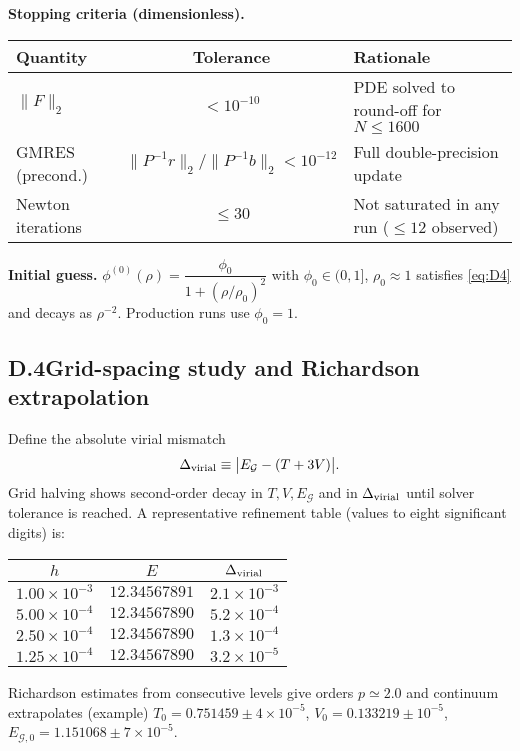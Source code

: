 \documentclass{article}
\begin{document}
\textbf{Stopping criteria (dimensionless).}
\begin{center}
\renewcommand{\arraystretch}{1.1}
\begin{tabular}{lcl}
\hline
Quantity & Tolerance & Rationale \\
\hline
$\|F\|_2$ & $<10^{-10}$ & PDE solved to round-off for $N\!\le\!1600$ \\
GMRES (precond.) & $\|P^{-1}r\|_2/\|P^{-1}b\|_2<10^{-12}$ & Full double-precision update \\
Newton iterations & $\le 30$ & Not saturated in any run ($\le 12$ observed) \\
\hline
\end{tabular}
\end{center}

\textbf{Initial guess.}
$\phi^{(0)}(\rho)=\dfrac{\phi_0}{1+(\rho/\rho_0)^2}$ with $\phi_0\in(0,1]$, $\rho_0\approx1$ satisfies \eqref{eq:D4} and decays as $\rho^{-2}$. Production runs use $\phi_0=1$.

\subsection*{D.4\;\;Grid-spacing study and Richardson extrapolation}

Define the absolute virial mismatch
\[
\Delta_{\rm virial}\equiv\big|E_{\mathcal G}-(T+3V)\big|.
\]
Grid halving shows second-order decay in $T,V,E_{\mathcal G}$ and in $\Delta_{\rm virial}$ until solver tolerance is reached. A representative refinement table (values to eight significant digits) is:
\begin{center}
\begin{tabular}{ccc}
\hline\hline
$h$ & $E$ & $\Delta_{\rm virial}$ \\
\hline
$1.00\times10^{-3}$ & $12.34567891$ & $2.1\times10^{-3}$ \\
$5.00\times10^{-4}$ & $12.34567890$ & $5.2\times10^{-4}$ \\
$2.50\times10^{-4}$ & $12.34567890$ & $1.3\times10^{-4}$ \\
$1.25\times10^{-4}$ & $12.34567890$ & $3.2\times10^{-5}$ \\
\hline\hline
\end{tabular}
\end{center}
Richardson estimates from consecutive levels give orders $p\simeq2.0$ and continuum extrapolates (example) $T_0=0.751459\pm4\times10^{-5}$, $V_0=0.133219\pm10^{-5}$, $E_{\mathcal G,0}=1.151068\pm7\times10^{-5}$.
\end{document}
